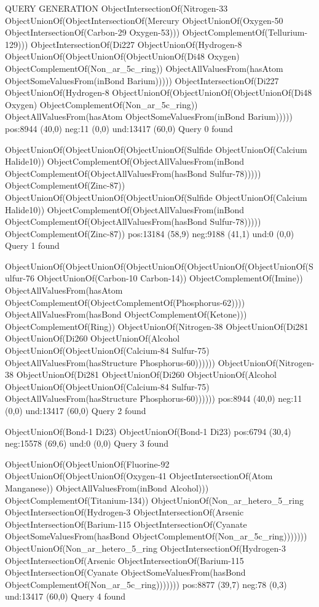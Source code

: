 QUERY GENERATION
ObjectIntersectionOf(Nitrogen-33 ObjectUnionOf(ObjectIntersectionOf(Mercury ObjectUnionOf(Oxygen-50 ObjectIntersectionOf(Carbon-29 Oxygen-53))) ObjectComplementOf(Tellurium-129)))
ObjectIntersectionOf(Di227 ObjectUnionOf(Hydrogen-8 ObjectUnionOf(ObjectUnionOf(ObjectUnionOf(Di48 Oxygen) ObjectComplementOf(Non_ar_5c_ring)) ObjectAllValuesFrom(hasAtom ObjectSomeValuesFrom(inBond Barium)))))
ObjectIntersectionOf(Di227 ObjectUnionOf(Hydrogen-8 ObjectUnionOf(ObjectUnionOf(ObjectUnionOf(Di48 Oxygen) ObjectComplementOf(Non_ar_5c_ring)) ObjectAllValuesFrom(hasAtom ObjectSomeValuesFrom(inBond Barium)))))
pos:8944 (40,0)		 neg:11 (0,0)		 und:13417 (60,0)
Query 0 found

ObjectUnionOf(ObjectUnionOf(ObjectUnionOf(Sulfide ObjectUnionOf(Calcium Halide10)) ObjectComplementOf(ObjectAllValuesFrom(inBond ObjectComplementOf(ObjectAllValuesFrom(hasBond Sulfur-78))))) ObjectComplementOf(Zinc-87))
ObjectUnionOf(ObjectUnionOf(ObjectUnionOf(Sulfide ObjectUnionOf(Calcium Halide10)) ObjectComplementOf(ObjectAllValuesFrom(inBond ObjectComplementOf(ObjectAllValuesFrom(hasBond Sulfur-78))))) ObjectComplementOf(Zinc-87))
pos:13184 (58,9)		 neg:9188 (41,1)		 und:0 (0,0)
Query 1 found

ObjectUnionOf(ObjectUnionOf(ObjectUnionOf(ObjectUnionOf(ObjectUnionOf(Sulfur-76 ObjectUnionOf(Carbon-10 Carbon-14)) ObjectComplementOf(Imine)) ObjectAllValuesFrom(hasAtom ObjectComplementOf(ObjectComplementOf(Phosphorus-62)))) ObjectAllValuesFrom(hasBond ObjectComplementOf(Ketone))) ObjectComplementOf(Ring))
ObjectUnionOf(Nitrogen-38 ObjectUnionOf(Di281 ObjectUnionOf(Di260 ObjectUnionOf(Alcohol ObjectUnionOf(ObjectUnionOf(Calcium-84 Sulfur-75) ObjectAllValuesFrom(hasStructure Phosphorus-60))))))
ObjectUnionOf(Nitrogen-38 ObjectUnionOf(Di281 ObjectUnionOf(Di260 ObjectUnionOf(Alcohol ObjectUnionOf(ObjectUnionOf(Calcium-84 Sulfur-75) ObjectAllValuesFrom(hasStructure Phosphorus-60))))))
pos:8944 (40,0)		 neg:11 (0,0)		 und:13417 (60,0)
Query 2 found

ObjectUnionOf(Bond-1 Di23)
ObjectUnionOf(Bond-1 Di23)
pos:6794 (30,4)		 neg:15578 (69,6)		 und:0 (0,0)
Query 3 found

ObjectUnionOf(ObjectUnionOf(Fluorine-92 ObjectUnionOf(ObjectUnionOf(Oxygen-41 ObjectIntersectionOf(Atom Manganese)) ObjectAllValuesFrom(inBond Alcohol))) ObjectComplementOf(Titanium-134))
ObjectUnionOf(Non_ar_hetero_5_ring ObjectIntersectionOf(Hydrogen-3 ObjectIntersectionOf(Arsenic ObjectIntersectionOf(Barium-115 ObjectIntersectionOf(Cyanate ObjectSomeValuesFrom(hasBond ObjectComplementOf(Non_ar_5c_ring)))))))
ObjectUnionOf(Non_ar_hetero_5_ring ObjectIntersectionOf(Hydrogen-3 ObjectIntersectionOf(Arsenic ObjectIntersectionOf(Barium-115 ObjectIntersectionOf(Cyanate ObjectSomeValuesFrom(hasBond ObjectComplementOf(Non_ar_5c_ring)))))))
pos:8877 (39,7)		 neg:78 (0,3)		 und:13417 (60,0)
Query 4 found

